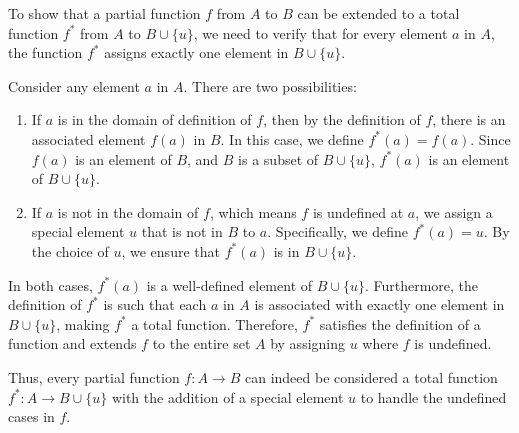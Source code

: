 			\begin{solution}
			To show that a partial function \( f \) from \( A \) to \( B \) can be extended to a total function \( f^* \) from \( A \) to \( B \cup \{u\} \), we need to verify that for every element \( a \) in \( A \), the function \( f^* \) assigns exactly one element in \( B \cup \{u\} \).
			
			Consider any element \( a \) in \( A \). There are two possibilities:
			
			\begin{enumerate}
				\item If \( a \) is in the domain of definition of \( f \), then by the definition of \( f \), there is an associated element \( f(a) \) in \( B \). In this case, we define \( f^*(a) = f(a) \). Since \( f(a) \) is an element of \( B \), and \( B \) is a subset of \( B \cup \{u\} \), \( f^*(a) \) is an element of \( B \cup \{u\} \).
				
				\item If \( a \) is not in the domain of \( f \), which means \( f \) is undefined at \( a \), we assign a special element \( u \) that is not in \( B \) to \( a \). Specifically, we define \( f^*(a) = u \). By the choice of \( u \), we ensure that \( f^*(a) \) is in \( B \cup \{u\} \).
			\end{enumerate}
			
			In both cases, \( f^*(a) \) is a well-defined element of \( B \cup \{u\} \). Furthermore, the definition of \( f^* \) is such that each \( a \) in \( A \) is associated with exactly one element in \( B \cup \{u\} \), making \( f^* \) a total function. Therefore, \( f^* \) satisfies the definition of a function and extends \( f \) to the entire set \( A \) by assigning \( u \) where \( f \) is undefined.
			
			Thus, every partial function \( f: A \rightarrow B \) can indeed be considered a total function \( f^*: A \rightarrow B \cup \{u\} \) with the addition of a special element \( u \) to handle the undefined cases in \( f \).
			\end{solution}

